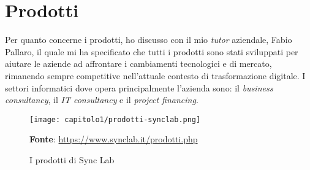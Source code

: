 
\section{Prodotti}
Per quanto concerne i prodotti, ho discusso con il mio \textit{tutor} aziendale, Fabio Pallaro, il quale mi ha specificato che tutti i prodotti sono stati sviluppati per aiutare le aziende ad affrontare i cambiamenti tecnologici e di mercato, rimanendo sempre competitive nell'attuale contesto di trasformazione digitale. I settori informatici dove opera principalmente l'azienda sono: il \textit{business consultancy}, il \textit{IT consultancy} e il \textit{project financing}.

\begin{figure}[!h]
  \centering
  \texttt{[image: capitolo1/prodotti-synclab.png]}
  \caption{I prodotti di Sync Lab}
  \textbf{Fonte}: \href{https://www.synclab.it/prodotti.php}{https://www.synclab.it/prodotti.php}
\end{figure}

